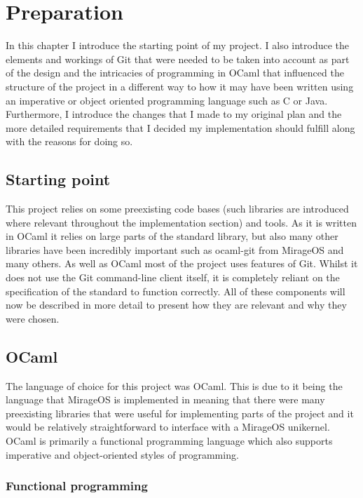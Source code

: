 \chapter{Preparation}

 In this chapter I introduce the starting point of my project. I also introduce the elements and workings of Git that were needed to be taken into account as part of the design and the intricacies of programming in OCaml that influenced the structure of the project in a different way to how it may have been written using an imperative or object oriented programming language such as C or Java. Furthermore, I introduce the changes that I made to my original plan and the more detailed requirements that I decided my implementation should fulfill along with the reasons for doing so.

\section{Starting point}

This project relies on some preexisting code bases (such libraries are introduced where relevant throughout the implementation section) and tools. As it is written in OCaml it relies on large parts of the standard library, but also many other libraries have been incredibly important such as ocaml-git from MirageOS and many others. As well as OCaml most of the project uses features of Git. Whilst it does not use the Git command-line client itself, it is completely reliant on the specification of the standard to function correctly. All of these components will now be described in more detail to present how they are relevant and why they were chosen.

\section{OCaml}

The language of choice for this project was OCaml\cite{code_ocaml}. This is due to it being the language that MirageOS is implemented in meaning that there were many preexisting libraries that were useful for implementing parts of the project and it would be relatively straightforward to interface with a MirageOS unikernel. OCaml is primarily a functional programming language which also supports imperative and object-oriented styles of programming.

\subsection{Functional programming}

